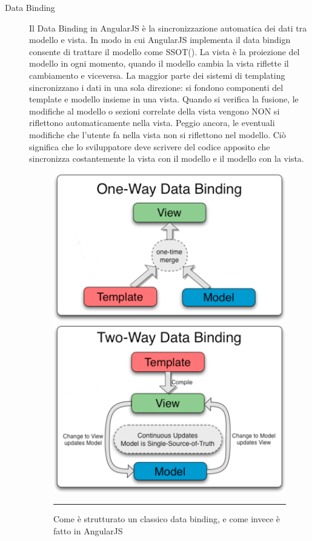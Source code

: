 \begin{description}

\item[Data Binding] Il Data Binding in AngularJS è la sincronizzazione automatica dei dati tra modello e vista. In modo in cui AngularJS implementa il data bindign consente di trattare il modello come SSOT(\cite{wiki:SSOT}). La vista è la proiezione del modello in ogni momento, quando il modello cambia la vista riflette il cambiamento e viceversa. 
La maggior parte dei sistemi di templating sincronizzano i dati in una sola direzione: si fondono componenti del template e modello insieme in una vista. Quando si verifica la fusione, le modifiche al modello o sezioni correlate della vista vengono NON si riflettono automaticamente nella vista. Peggio ancora, le eventuali modifiche che l'utente fa nella vista non si riflettono nel modello. Ciò significa che lo sviluppatore deve scrivere del codice apposito che sincronizza costantemente la vista con il modello e il modello con la vista.

\begin{figure}[htbp]
  \centering
    \includegraphics[scale=0.5]{Figures/one-way-data-binding.png} 
    \includegraphics[scale=0.5]{Figures/two-way-data-binding.png} 
    \rule{35em}{0.5pt}
  \caption[Data Bindings]{Come è strutturato un classico data binding, e come invece è fatto in AngularJS}
  \label{fig:Data Binding}
\end{figure}


\end{description}
